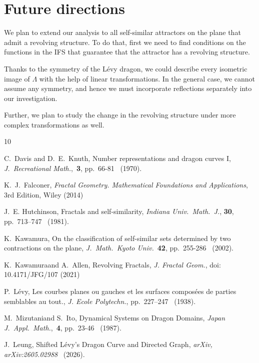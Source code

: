 \documentclass[12pt, a4paper]{amsart}
\numberwithin{equation}{section}
\numberwithin{theorem}{section}
\begin{document}
\section{Future directions}

We plan to extend our analysis to all self-similar attractors on the plane that admit a revolving structure. To do that, first we need to find conditions on the functions in the IFS that guarantee that the attractor has a revolving structure.

Thanks to the symmetry of the L\'evy dragon, we could describe every isometric image of $\Lambda$ with the help of linear transformations. In the general case, we cannot assume any symmetry, and hence we must incorporate reflections separately into our investigation. 

Further, we plan to study the change in the revolving structure under more complex transformations as well.







\begin{thebibliography}{10}

{\sc C.~Davis} and {\sc D.~E.~Knuth}\@, {Number representations and dragon curves I}, {\em J.\ Recreational Math.},\ {\bf 3}, pp.~66-81 \ (1970).


{\sc K.~J.~Falconer}\@, {\it Fractal Geometry. Mathematical Foundations and Applications}, 3rd Edition, Wiley (2014)

{\sc J.~E. Hutchinson}\@, {Fractals and self-similarity}, {\em Indiana Univ.\ Math.\ J.}, {\bf 30}, pp.~713--747 \ (1981).

{\sc K.~Kawamura}\@, {On the classification of self-similar sets determined by two contractions on the plane}, {\em J.\ Math.\ Kyoto Univ.}\ {\bf 42}, pp.~255-286 \ (2002). 


{\sc K.~Kawamura}\@ and {\sc A.~Allen}\@, {Revolving Fractals}, {\em J. Fractal Geom.}, doi: 10.4171/JFG/107 (2021)

{\sc P.~L\'evy}\@, {Les courbes planes ou gauches et les surfaces compos\'ees de parties semblables au tout.}, {\em J. Ecole Polytechn.}, pp.~227--247 \ (1938).


{\sc M.~Mizutani}\@ and {\sc S.~Ito}\@, {Dynamical Systems on Dragon Domains}, {\em Japan J.\ Appl.\ Math.},\ {\bf 4}, pp.~23-46 \ (1987).

{\sc J.~Leung}\@, {Shifted Lévy's Dragon Curve and Directed Graph}, {\em arXiv, 	arXiv:2605.02988} \ (2026).


\end{thebibliography}
\end{document}
